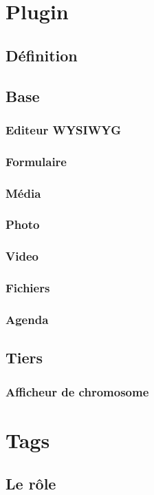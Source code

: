 \documentclass[11pt]{report}
\begin{document}
\chapter{Plugin}
	\section{Définition}
	\section{Base}
		\subsection{Editeur WYSIWYG}
		\subsection{Formulaire}
		\subsection{Média}
			\subsection{Photo}
			\subsection{Video}
			\subsection{Fichiers}	
		\subsection{Agenda}
	\section{Tiers}
		\subsection{Afficheur de chromosome}

\chapter{Tags}

	\section{Le rôle}
	
\end{document}

